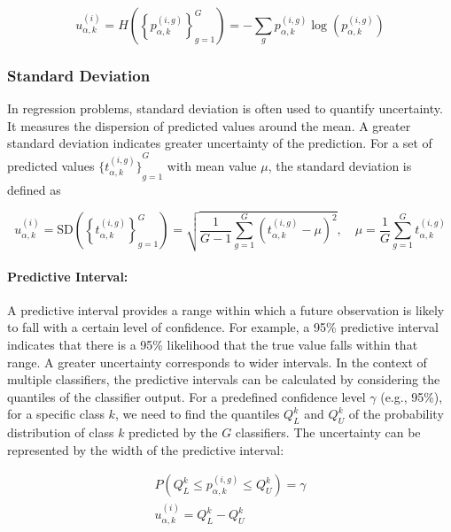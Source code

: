 \begin{equation}
u_{\alpha,k}^{(i)}=H\left( {\left\{p_{\alpha,k}^{(i,g)}\right\}}_{g=1}^{G}\right)=-\sum_{g}{p_{\alpha,k}^{(i,g)} \log\left(p_{\alpha,k}^{(i,g)}\right)}
\label{eq:crowd.eq.5.uncertainty}
\end{equation}


\subsubsection{Standard Deviation}
In regression problems, standard deviation is often used to quantify uncertainty. It measures the dispersion of predicted values around the mean. A greater standard deviation indicates greater uncertainty of the prediction. For a set of predicted values $ {\{t_{\alpha,k}^{(i,g)} \}}_{g=1}^G $ with mean value $\mu $, the standard deviation is defined as

\begin{equation}
    u_{\alpha,k}^{(i)}=\text{SD}\left( {\left\{t_{\alpha,k}^{(i,g)}\right\}}_{g=1}^G\right)=\sqrt {\frac{1}{G-1} \sum_{g=1}^G {\left(t_{\alpha,k}^{(i,g)}-\mu\right)}^2},\quad\mu=\frac{1}{G}\sum_{g=1}^{G}{t_{\alpha,k}^{(i,g)}}
    \label{eq:crowd.eq.6.uncertainty.sd}
\end{equation}

\paragraph{Predictive Interval:}
A predictive interval provides a range within which a future observation is likely to fall with a certain level of confidence. For example, a 95\% predictive interval indicates that there is a 95\% likelihood that the true value falls within that range. A greater uncertainty corresponds to wider intervals. In the context of multiple classifiers, the predictive intervals can be calculated by considering the quantiles  of the classifier output. For a predefined confidence level $\gamma $ (e.g., 95\%), for a specific class $k $, we need to find the quantiles $Q_{L}^{k} $ and $Q_{U}^{k} $ of the probability distribution of class $k $ predicted by the $G $ classifiers. The uncertainty can be represented by the width of the predictive interval:

\begin{equation}
    \begin{aligned}
        P\left(Q_L^{k} \leq p_{\alpha,k}^{(i,g)} \leq Q_U^{k}\right) = \gamma
        \\
        u_{\alpha,k}^{(i)} = Q_L^{k} - Q_U^{k}
    \end{aligned}
    \label{eq:crowd.eq.uncertainty}
\end{equation}

